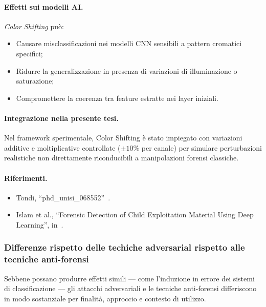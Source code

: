 \paragraph{Effetti sui modelli AI.}
\textit{Color Shifting} può:
\begin{itemize}
    \item Causare misclassificazioni nei modelli CNN sensibili a pattern cromatici specifici;
    \item Ridurre la generalizzazione in presenza di variazioni di illuminazione o saturazione;
    \item Compromettere la coerenza tra feature estratte nei layer iniziali.
\end{itemize}

\paragraph{Integrazione nella presente tesi.}
Nel framework sperimentale, Color Shifting è stato impiegato con variazioni additive e moltiplicative controllate ($\pm 10\%$ per canale) per simulare perturbazioni realistiche non direttamente riconducibili a manipolazioni forensi classiche.

\paragraph{Riferimenti.}
\begin{itemize}
    \item Tondi, “phd\_unisi\_068552”~\cite{phd_unisi_068552}.
    \item Islam et al., “Forensic Detection of Child Exploitation Material Using Deep Learning”, in~\cite{DeepLearningForCyberSec}.
\end{itemize}




\subsubsection*{Differenze rispetto delle techiche adversarial rispetto alle tecniche anti-forensi}

Sebbene possano produrre effetti simili — come l’induzione in errore dei sistemi di classificazione — gli attacchi adversariali e le tecniche anti-forensi differiscono in modo sostanziale per finalità, approccio e contesto di utilizzo.

